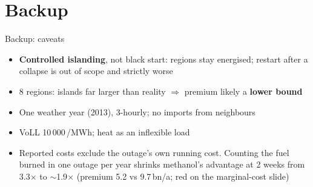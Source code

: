 \documentclass[10pt,aspectratio=169,dvipsnames]{beamer}
\begin{document}
\begin{frame}
	\centering
\end{frame}

\appendix

\section{Backup}

 {
  \begin{frame}{Backup: caveats}
	  \begin{itemize}\setlength{\itemsep}{0.7em}
		  \item \textbf{Controlled islanding}, not black start: regions stay energised; restart after
		        a collapse is out of scope and strictly worse
		  \item 8 regions: islands far larger than reality $\Rightarrow$ premium likely a
		        \textbf{lower bound}
		  \item One weather year (2013), 3-hourly; no imports from neighbours
		  \item VoLL 10\,000\,\texteuro/MWh; heat as an inflexible load
		  \item Reported costs exclude the outage's own running cost. Counting the fuel burned in
		        one outage per year shrinks methanol's advantage at 2 weeks from 3.3$\times$ to
		        ${\sim}$1.9$\times$ (premium 5.2 vs 9.7\,bn\texteuro/a; red on the
		        marginal-cost slide)
	  \end{itemize}
  \end{frame}}
\end{document}
